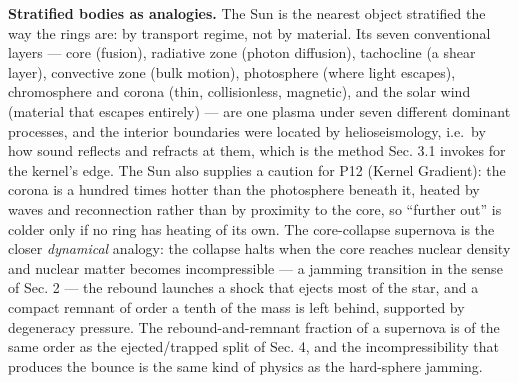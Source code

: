\documentclass[
  11pt,
]{article}
\begin{document}
\textbf{Stratified bodies as analogies.} The Sun is the nearest object
stratified the way the rings are: by transport regime, not by material.
Its seven conventional layers --- core (fusion), radiative zone (photon
diffusion), tachocline (a shear layer), convective zone (bulk motion),
photosphere (where light escapes), chromosphere and corona (thin,
collisionless, magnetic), and the solar wind (material that escapes
entirely) --- are one plasma under seven different dominant processes,
and the interior boundaries were located by helioseismology, i.e.~by how
sound reflects and refracts at them, which is the method Sec. 3.1
invokes for the kernel's edge. The Sun also supplies a caution for P12
(Kernel Gradient): the corona is a hundred times hotter than the
photosphere beneath it, heated by waves and reconnection rather than by
proximity to the core, so ``further out'' is colder only if no ring has
heating of its own. The core-collapse supernova is the closer
\emph{dynamical} analogy: the collapse halts when the core reaches
nuclear density and nuclear matter becomes incompressible --- a jamming
transition in the sense of Sec. 2 --- the rebound launches a shock that
ejects most of the star, and a compact remnant of order a tenth of the
mass is left behind, supported by degeneracy pressure. The
rebound-and-remnant fraction of a supernova is of the same order as the
ejected/trapped split of Sec. 4, and the incompressibility that produces
the bounce is the same kind of physics as the hard-sphere jamming.
\end{document}
